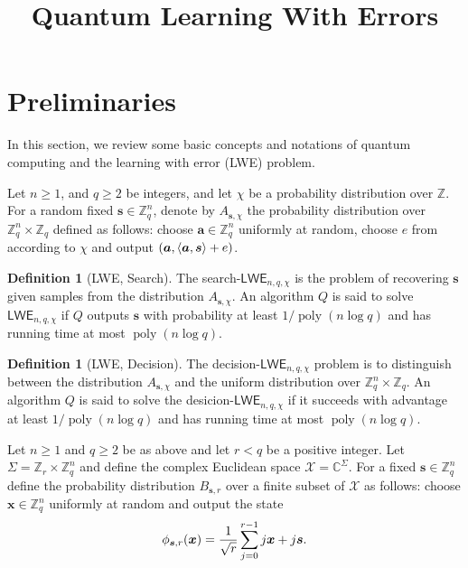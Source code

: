 \documentclass[11pt]{article}
\title{Quantum Learning With Errors}
\author{
}
\date{}
\theoremstyle{plain}
\theoremstyle{definition}
\newtheorem{definition}[theorem]{Definition}
\DeclareMathOperator{\poly}{poly}
\let\ket\relax
\DeclarePairedDelimiter{\ket}{\lvert}{\rangle}
\DeclarePairedDelimiter{\lrang}{\langle}{\rangle}
\def\C{\mathbb{C}}
\def\Z{\mathbb{Z}}
\def\lwe{\mathsf{LWE}}
\begin{document}
\maketitle








\section{Preliminaries}
\label{sec:preli}

In this section, we review some basic concepts and notations of quantum computing and the learning with error (LWE) problem. 

Let $n \ge 1$, and $q \ge 2$ be integers, and let $\chi$ be a probability distribution over $\Z$. For a random fixed $\bm{s} \in \Z_q^n$, denote by $A_{\bm{s}, \chi}$ the probability distribution over $\Z_q^n \times \Z_q$ defined as follows: choose $\bm{a} \in \Z_q^n$ uniformly at random, choose $e$ from according to $\chi$ and output  $(\bm{a}, \lrang{\bm{a}, \bm{s}} + e)$.
\begin{definition}[LWE, Search]
The search-$\lwe_{n, q, \chi}$ is the problem of recovering $\bm{s}$ given samples from the distribution $A_{\bm{s}, \chi}$. An algorithm $Q$ is said to solve $\lwe_{n, q, \chi}$ if $Q$  outputs $\bm{s}$ with probability at least $1 / \poly(n\log q)$ and has running time at most $\poly(n \log q)$.
\end{definition}
\begin{definition}[LWE, Decision]
    The decision-$\lwe_{n, q, \chi}$ problem is to distinguish between the distribution $A_{\bm{s}, \chi}$ and the uniform distribution over $\Z_q^n \times \Z_q$. An algorithm $Q$ is said to solve the desicion-$\lwe_{n, q, \chi}$ if it succeeds with advantage at least $1 / \poly(n\log q)$ and has running time at most $\poly(n\log q)$. 
\end{definition}
Let $n \ge 1$ and $q \ge 2$ be as above and let $r < q$ be a positive integer. Let $\Sigma = \Z_r \times \Z_q^n$ and define the complex Euclidean space $\mathcal{X} = \C^\Sigma$. For a fixed $\bm{s} \in \Z_q^n$ define the probability distribution $B_{\bm{s}, r}$ over a finite subset of $\mathcal{X}$ as follows: choose $\bm{x} \in \Z_q^n$ uniformly at random and output the state
\[ \ket{\phi_{\bm{s}, r}(\bm{x})} = \frac{1}{\sqrt{r}} \sum_{j = 0}^{r - 1}\ket{j}\ket{\bm{x} + j\bm{s}}. \]
\end{document}
